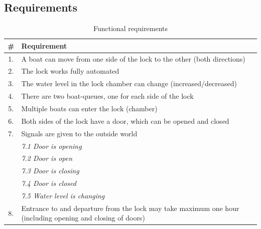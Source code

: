 \documentclass{article}
\begin{document}
    \subsection{Requirements}
        \begin{table}[h]
            \centering
            \begin{tabular}{|c|p{10cm}|}
                \hline
              \textbf{\#} & \textbf{Requirement} \\
              \hline
              1. & A boat can move from one side of the lock to the other (both directions) \\
              \hline
              2. & The lock works fully automated \\
              \hline
              3. & The water level in the lock chamber can change (increased/decreased) \\
              \hline
              4. & There are two boat-queues, one for each side of the lock \\
              \hline
              5. & Multiple boats can enter the lock (chamber) \\
              \hline
              6. & Both sides of the lock have a door, which can be opened and closed \\
              \hline
              7. & Signals are given to the outside world \\
                 & \textit{7.1 Door is opening} \\
                 & \textit{7.2 Door is open} \\
                 & \textit{7.3 Door is closing} \\
                 & \textit{7.4 Door is closed} \\
                 & \textit{7.5 Water level is changing} \\
              \hline
              8. & Entrance to and departure from the lock may take maximum one hour (including opening and closing of doors) \\
              \hline
            \end{tabular}
            \caption{Functional requirements}
            \label{tab:func_req}
        \end{table}
        
\end{document}
